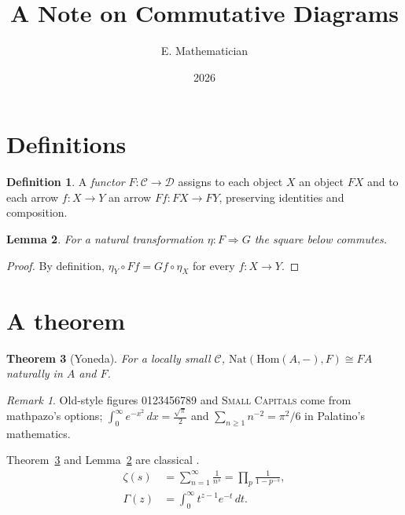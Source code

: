 \documentclass[11pt]{article}
\title{\textsf{A Note on Commutative Diagrams}}
\author{E. Mathematician}
\date{2026}
\newtheorem{theorem}{Theorem}[section]
\newtheorem{lemma}[theorem]{Lemma}
\theoremstyle{definition}
\newtheorem{definition}[theorem]{Definition}
\theoremstyle{remark}
\newtheorem*{remark}{Remark}
\begin{document}
\maketitle
\section{Definitions}
\begin{definition}\label{def:functor}
A \emph{functor} $F\colon \mathcal{C} \to \mathcal{D}$ assigns to each
object $X$ an object $FX$ and to each arrow $f\colon X\to Y$ an arrow
$Ff\colon FX \to FY$, preserving identities and composition.
\end{definition}
\begin{lemma}\label{lem:square}
For a natural transformation $\eta\colon F \Rightarrow G$ the square
below commutes.
\end{lemma}
\begin{center}
\end{center}
\begin{proof}
By definition, $\eta_Y \circ Ff = Gf \circ \eta_X$ for every
$f\colon X \to Y$.
\end{proof}
\section{A theorem}
\begin{theorem}[Yoneda]\label{thm:yoneda}
For a locally small $\mathcal{C}$, $\mathrm{Nat}(\mathrm{Hom}(A,-), F)
\cong F A$ naturally in $A$ and $F$.
\end{theorem}
\begin{remark}
Old-style figures 0123456789 and \textsc{Small Capitals} come from
mathpazo's options; $\int_0^\infty e^{-x^2}\,dx = \tfrac{\sqrt{\pi}}{2}$
and $\sum_{n\ge1} n^{-2} = \pi^2/6$ in Palatino's mathematics.
\end{remark}
Theorem~\ref{thm:yoneda} and Lemma~\ref{lem:square} are classical
\cite{lamport1994}.
\begin{align}
  \zeta(s) &= \sum_{n=1}^{\infty} \frac{1}{n^s} = \prod_{p} \frac{1}{1-p^{-s}}, \\
  \Gamma(z) &= \int_0^\infty t^{z-1} e^{-t}\, dt .
\end{align}


\end{document}

